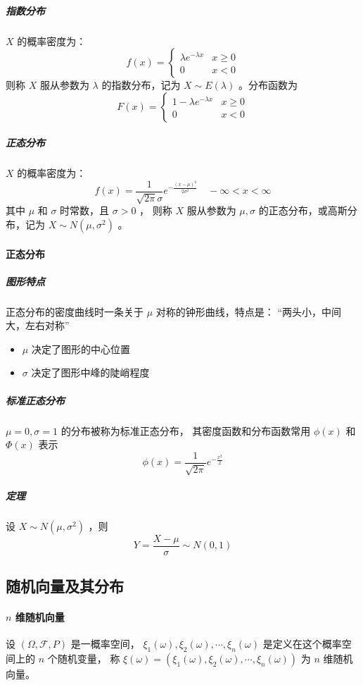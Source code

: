 \subparagraph{指数分布} $ X $ 的概率密度为：
\begin{equation}
    f(x) = \left\{ \begin{array}{ll}
        \lambda e^{-\lambda x} & x \geqslant 0 \\
        0 & x < 0
    \end{array} \right.
\end{equation}
则称 $ X $ 服从参数为 $ \lambda $ 的指数分布，记为 $ X \sim E(\lambda) $ 。分布函数为
\begin{equation}
    F(x) = \left\{ \begin{array}{ll}
        1 - \lambda e^{-\lambda x} & x \geqslant 0 \\
        0 & x < 0
    \end{array} \right.
\end{equation}

\subparagraph{正态分布} $ X $ 的概率密度为：
\begin{equation}
    f(x) = \frac{1}{\sqrt{2\pi} \sigma} e ^{- \frac{(x-\mu)^2}{2 \sigma^2}} \quad -\infty < x < \infty
\end{equation}
其中 $ \mu $ 和 $ \sigma $ 时常数，且 $ \sigma > 0 $ ，
则称 $ X $ 服从参数为 $ \mu, \sigma $ 的正态分布，或高斯分布，记为 $ X \sim N(\mu, \sigma^2) $ 。

\paragraph{正态分布}
\subparagraph{图形特点} 正态分布的密度曲线时一条关于 $ \mu $ 对称的钟形曲线，特点是：
“两头小，中间大，左右对称”
\begin{itemize}[leftmargin=\subparitemindent]
    \item $ \mu $ 决定了图形的中心位置
    \item $ \sigma $ 决定了图形中峰的陡峭程度
\end{itemize}

\subparagraph{标准正态分布} $ \mu = 0, \sigma = 1 $ 的分布被称为标准正态分布，
其密度函数和分布函数常用 $ \phi(x) $ 和 $ \Phi(x) $ 表示
$$ \phi(x) = \frac{1}{\sqrt{2\pi}} e^{-\frac{x^2}{2}} $$

\subparagraph{定理} 设 $ X \sim N(\mu, \sigma^2) $ ，则 $$ Y = \frac{X-\mu}{\sigma} \sim N(0,1) $$


\subsection{随机向量及其分布}

\paragraph{$ n $ 维随机向量} 设 $ (\Omega, \mathcal{F}, P) $ 是一概率空间，
$ \xi_{1}{(\omega)} , \xi_{2}{(\omega)} , \cdots , \xi_{n}{(\omega)}  $ 是定义在这个概率空间上的 $ n $ 个随机变量，
称 $ \xi(\omega) = (\xi_{1}{(\omega)} , \xi_{2}{(\omega)} , \cdots , \xi_{n}{(\omega)}) $ 为 $ n $ 维随机向量。

